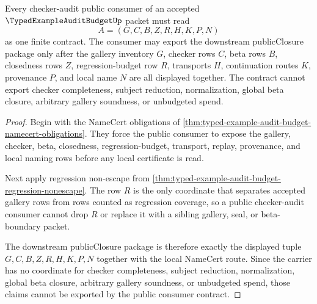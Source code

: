 \begin{theorem}
\label{thm:typed-example-audit-budget-public-consumer-contract}
Every checker-audit public consumer of an accepted $\TypedExampleAuditBudgetUp$ packet must read
$$
A=(G,C,B,Z,R,H,K,P,N)
$$
as one finite contract. The consumer may export the downstream publicClosure package only after the gallery inventory $G$, checker rows $C$, beta rows $B$, closedness rows $Z$, regression-budget row $R$, transports $H$, continuation routes $K$, provenance $P$, and local name $N$ are all displayed together. The contract cannot export checker completeness, subject reduction, normalization, global beta closure, arbitrary gallery soundness, or unbudgeted spend.
\end{theorem}
\begin{proof}
Begin with the NameCert obligations of \autoref{thm:typed-example-audit-budget-namecert-obligations}. They force the public consumer to expose the gallery, checker, beta, closedness, regression-budget, transport, replay, provenance, and local naming rows before any local certificate is read.

Next apply regression non-escape from \autoref{thm:typed-example-audit-budget-regression-nonescape}. The row $R$ is the only coordinate that separates accepted gallery rows from rows counted as regression coverage, so a public checker-audit consumer cannot drop $R$ or replace it with a sibling gallery, seal, or beta-boundary packet.

The downstream publicClosure package is therefore exactly the displayed tuple $G,C,B,Z,R,H,K,P,N$ together with the local NameCert route. Since the carrier has no coordinate for checker completeness, subject reduction, normalization, global beta closure, arbitrary gallery soundness, or unbudgeted spend, those claims cannot be exported by the public consumer contract.
\end{proof}

